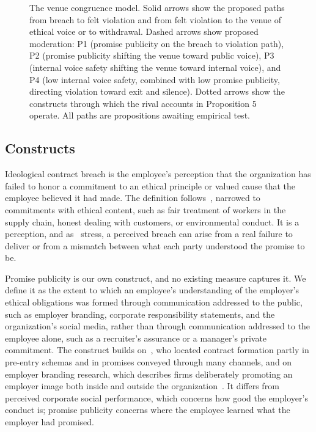 \begin{figure}[htb]
{\begin{tikzpicture}
\end{tikzpicture}}
\caption{The venue congruence model. Solid arrows show the proposed paths from breach to felt violation and from felt violation to the venue of ethical voice or to withdrawal. Dashed arrows show proposed moderation: P1 (promise publicity on the breach to violation path), P2 (promise publicity shifting the venue toward public voice), P3 (internal voice safety shifting the venue toward internal voice), and P4 (low internal voice safety, combined with low promise publicity, directing violation toward exit and silence). Dotted arrows show the constructs through which the rival accounts in Proposition 5 operate. All paths are propositions awaiting empirical test.}\label{fig:model}
\end{figure}

\subsection{Constructs}

Ideological contract breach is the employee's perception that the organization has failed to honor a commitment to an ethical principle or valued cause that the employee believed it had made. The definition follows~\citet{thompson2003violations}, narrowed to commitments with ethical content, such as fair treatment of workers in the supply chain, honest dealing with customers, or environmental conduct. It is a perception, and as~\citet{morrison1997employees} stress, a perceived breach can arise from a real failure to deliver or from a mismatch between what each party understood the promise to be.

Promise publicity is our own construct, and no existing measure captures it. We define it as the extent to which an employee's understanding of the employer's ethical obligations was formed through communication addressed to the public, such as employer branding, corporate responsibility statements, and the organization's social media, rather than through communication addressed to the employee alone, such as a recruiter's assurance or a manager's private commitment. The construct builds on~\citet{rousseau2001schema}, who located contract formation partly in pre-entry schemas and in promises conveyed through many channels, and on employer branding research, which describes firms deliberately promoting an employer image both inside and outside the organization~\citep{backhaus2004conceptualizing}. It differs from perceived corporate social performance, which concerns how good the employer's conduct is; promise publicity concerns where the employee learned what the employer had promised.


